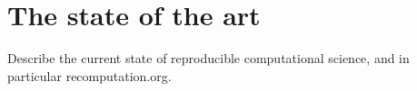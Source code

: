 \section{The state of the art}
\label{s:recomputation}

Describe the current state of reproducible computational science, and
in particular recomputation.org.
\cite{gent:recomputation}
